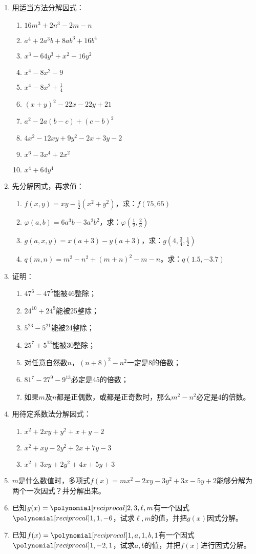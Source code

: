\begin{enumerate}
    \item 用适当方法分解因式：
    \begin{multicols}{2}
\begin{enumerate}
    \item $16m^3+2n^3-2m-n$
    \item $a^4+2a^3b+8ab^3+16b^4$
    \item $x^3-64y^3+x^2-16y^2$
    \item $x^4-8x^2-9$
    \item $x^4-8x^2+\frac{1}{4}$
    \item $(x+y)^2-22x-22y+21$
    \item $a^2-2a(b-c)+(c-b)^2$
    \item $4x^2-12xy+9y^2-2x+3y-2$
    \item $x^6-3x^4+2x^2$
    \item $x^4+64y^4$
\end{enumerate}
\end{multicols}
    \item 先分解因式，再求值：
\begin{enumerate}
    \item $f(x,y)=xy-\frac{1}{2}(x^2+y^2)$，求：$f(75,65)$
    \item $\varphi(a,b)=6a^3b-3a^2b^2$，求：$\varphi\left(\frac{1}{2},\frac{2}{3}\right)$    
    \item $g(a,x,y)=x(a+3)-y(a+3)$，求：$g\left(4,\frac{3}{4},\frac{1}{2}\right)$
    \item $q(m,n)=m^2-n^2+(m+n)^2-m-n$。求：$q(1.5,-3.7)$
\end{enumerate}
    \item 证明：
\begin{enumerate}
    \item $47^6-47^5$能被46整除；
    \item $24^{10}+24^9$能被25整除；
    \item $5^{23}-5^{21}$能被24整除；
    \item $25^7+5^{13}$能被30整除；
    \item 对任意自然数$n$，$(n+8)^2-n^2$一定是8的倍数；
    \item $81^7-27^9-9^{13}$必定是45的倍数；
    \item 如果$m$及$n$都是正偶数，或都是正奇数时，那么$m^2-n^2$必定是4的倍数。
\end{enumerate}
    \item 用待定系数法分解因式：
    \begin{enumerate}
    \item $x^2+2xy+y^2+x+y-2$
    \item $x^2+xy-2y^2+2x+7y-3$
    \item $x^2+3xy+2y^2+4x+5y+3$
\end{enumerate}
    \item $m$是什么数值时，多项式$f(x)=mx^2-2xy-3y^2+3x-5y+2$能够分解为两个一次因式？并分解出来。
    \item 已知$g(x)=\poly{2,3,\ell,m}$有一个因式$\poly{1,1,-6}$，试求$\ell,m$的值，并把$g(x)$因式分解。
    \item 已知$f(x)=\poly{1,a,1,b,1}$有一个因式$\poly{1,-2,1}$，试求$a,b$的值，并把$f(x)$进行因式分解。
\end{enumerate}

